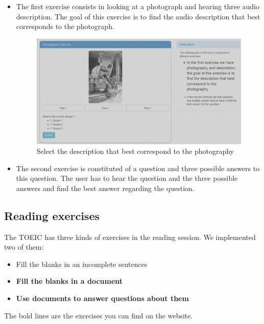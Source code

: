 \documentclass[12pt,a4paper]{report}
\begin{document}
\begin{itemize}
\item The first exercise consists in looking at a photograph and hearing three audio description. The goal of this exercise is to find the audio description that best corresponds to the photograph.

\begin{figure}[here]
\includegraphics[scale=0.45]{captureToeic.png}
\caption{Select the description that best correspond to the photography}
\end{figure}

\item The second exercise is constituted of a question and three possible answers to this question. The user has to hear the question and the three possible answers and find the best answer regarding the question.
\end{itemize}

\subsection{Reading exercises}
The TOEIC has three kinds of exercises in the reading session. We implemented
two of them:

\begin{itemize}
\item Fill the blanks in an incomplete sentences
\item \textbf{Fill the blanks in a document}
\item \textbf{Use documents to answer questions about them}
\end{itemize}

The bold lines are the exercises you can find on the website.
\end{document}
